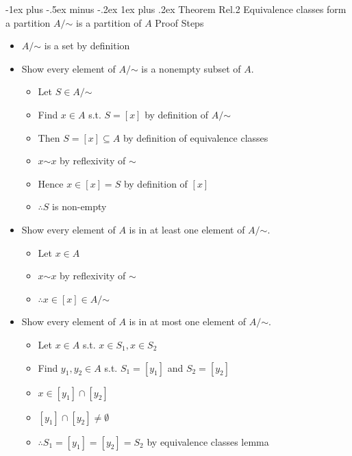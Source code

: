 \documentclass[10pt, portrait]{article}
\makeatletter
\renewcommand{\subsection}{\@startsection{subsection}{3}{0mm}%
                                {-1ex plus -.5ex minus -.2ex}%
                                {1ex plus .2ex}%
                                {\normalfont\small\bfseries}}%
\renewcommand{\lnot}{\mathord{\sim}}
\makeatother
\begin{document}
\begin{multicols*}{2}
\subsection{Theorem Rel.2 Equivalence classes form a partition}
$A / \lnot$ is a partition of $A$
Proof Steps
\begin{itemize}
    \item $A / \lnot$ is a set by definition
    \item Show every element of $A / \lnot$ is a nonempty subset of $A$.
    \begin{itemize}
        \item Let $S \in A / \lnot$
        \item Find $x \in A$ s.t. $S = [x]$ by definition of $A / \lnot$
        \item Then $S = [x] \subseteq A$ by definition of equivalence classes
        \item $x \lnot x$ by reflexivity of $\lnot$
        \item Hence $x \in [x] = S$ by definition of $[x]$
        \item $\therefore S$ is non-empty
    \end{itemize}
    \item Show every element of $A$ is in at least one element of $A / \lnot$.
        \begin{itemize}
            \item Let $x \in A$
            \item $x \lnot x$ by reflexivity of $\lnot$
            \item $\therefore x \in [x] \in A / \lnot$
        \end{itemize}
    \item Show every element of $A$ is in at most one element of $A / \lnot$.
    \begin{itemize}
        \item Let $x \in A$  s.t. $x \in S_1, x \in S_2$
        \item Find $y_1, y_2 \in A$ s.t. $S_1 = [y_1]$ and $S_2 = [y_2]$
        \item $x \in [y_1] \cap [y_2]$
        \item $[y_1] \cap [y_2] \neq \emptyset$
        \item $\therefore S_1 = [y_1] = [y_2] = S_2$ by equivalence classes lemma
    \end{itemize}
\end{itemize}


\end{multicols*}
\end{document}
